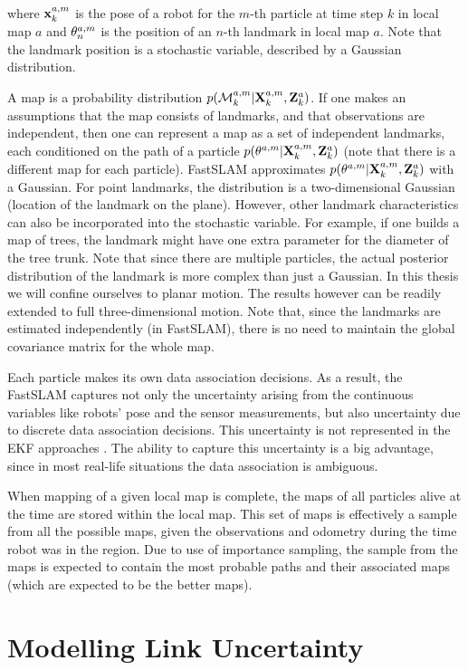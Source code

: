 where $\x{k}{a}{m}$ is the pose of a robot for the $m$-th particle at
time step $k$ in local map $a$ and $\mape{a}{m}{n}$ is the position
of an $n$-th landmark in local map $a$. Note that the landmark
position is a stochastic variable, described by a Gaussian
distribution.

A map is a probability distribution
$p(\map{k}{a}{m}|\Xall{k}{a}{m},\Zall{k}{a})$. If one makes an
assumptions that the map consists of landmarks, and that observations
are independent, then one can represent a map as a set of independent
landmarks, each conditioned on the path of a particle
$p(\mape{a}{m}{}|\Xall{k}{a}{m},\Zall{k}{a})$ (note that there is a
different map for each particle). FastSLAM approximates
$p(\mape{a}{m}{}|\Xall{k}{a}{m},\Zall{k}{a})$ with a Gaussian.  For
point landmarks, the distribution is a two-dimensional Gaussian
(location of the landmark on the plane). However, other landmark
characteristics can also be incorporated into the stochastic
variable. For example, if one builds a map of trees, the landmark
might have one extra parameter for the diameter of the tree trunk.
Note that since there are multiple particles, the actual posterior
distribution of the landmark is more complex than just a Gaussian. In
this thesis we will confine ourselves to planar motion. The
results however can be readily extended to full three-dimensional motion. Note
that, since the landmarks are estimated independently (in FastSLAM),
there is no need to maintain the global covariance matrix for the
whole map.

Each particle makes its own data association decisions. As a result,
the FastSLAM captures not only the uncertainty arising from the
continuous variables like robots' pose and the sensor measurements,
but also uncertainty due to discrete data association decisions.  This
uncertainty is not represented in the EKF approaches \cite{ekf_slam}.
The ability to capture this uncertainty is a big advantage, since in
most real-life situations the data association is ambiguous.

When mapping of a given local map is complete, the maps of all
particles alive at the time are stored within the local map. This set
of maps is effectively a sample from all the possible maps, given the
observations and odometry during the time robot was in the region.
Due to use of importance sampling, the sample from the maps is
expected to contain the most probable paths and their associated maps
(which are expected to be the better maps).

\section{Modelling Link Uncertainty}
\label{sec:link}

